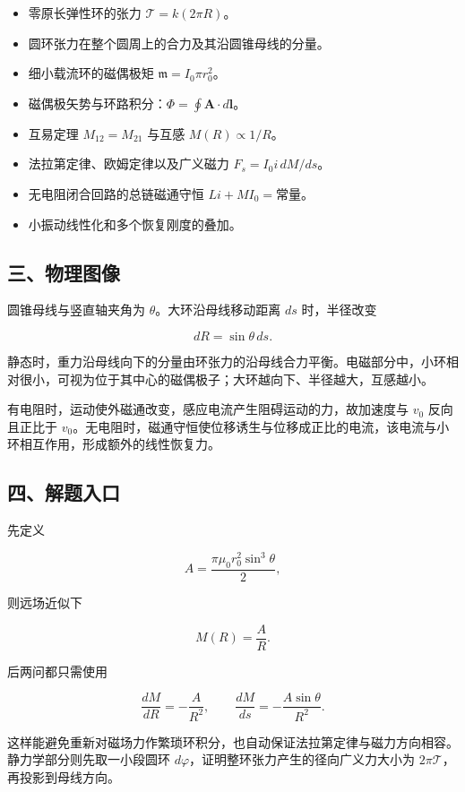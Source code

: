 \documentclass[12pt,a4paper,UTF8]{ctexart}
\newcommand{\tightlist}{\setlength{\itemsep}{0pt}\setlength{\parskip}{0pt}}
\begin{document}
\begin{itemize}
\tightlist
\item
  零原长弹性环的张力 \(\mathcal T=k(2\pi R)\)。
\item
  圆环张力在整个圆周上的合力及其沿圆锥母线的分量。
\item
  细小载流环的磁偶极矩 \(\mathfrak m=I_0\pi r_0^2\)。
\item
  磁偶极矢势与环路积分：\(\Phi=\oint\bm A\cdot d\bm l\)。
\item
  互易定理 \(M_{12}=M_{21}\) 与互感 \(M(R)\propto1/R\)。
\item
  法拉第定律、欧姆定律以及广义磁力 \(F_s=I_0i\,dM/ds\)。
\item
  无电阻闭合回路的总链磁通守恒 \(Li+MI_0=\text{常量}\)。
\item
  小振动线性化和多个恢复刚度的叠加。
\end{itemize}

\subsection{三、物理图像}\label{ux4e09ux7269ux7406ux56feux50cf-4}

圆锥母线与竖直轴夹角为 \(\theta\)。大环沿母线移动距离 \(ds\)
时，半径改变

\[dR=\sin\theta\,ds.\]

静态时，重力沿母线向下的分量由环张力的沿母线合力平衡。电磁部分中，小环相对很小，可视为位于其中心的磁偶极子；大环越向下、半径越大，互感越小。

有电阻时，运动使外磁通改变，感应电流产生阻碍运动的力，故加速度与 \(v_0\)
反向且正比于
\(v_0\)。无电阻时，磁通守恒使位移诱生与位移成正比的电流，该电流与小环相互作用，形成额外的线性恢复力。

\subsection{四、解题入口}\label{ux56dbux89e3ux9898ux5165ux53e3-4}

先定义

\[A=\frac{\pi\mu_0r_0^2\sin^3\theta}{2},\]

则远场近似下

\[M(R)=\frac AR.\]

后两问都只需使用

\[\frac{dM}{dR}=-\frac{A}{R^2},\qquad
\frac{dM}{ds}=-\frac{A\sin\theta}{R^2}.\]

这样能避免重新对磁场力作繁琐环积分，也自动保证法拉第定律与磁力方向相容。静力学部分则先取一小段圆环
\(d\varphi\)，证明整环张力产生的径向广义力大小为
\(2\pi\mathcal T\)，再投影到母线方向。
\end{document}

